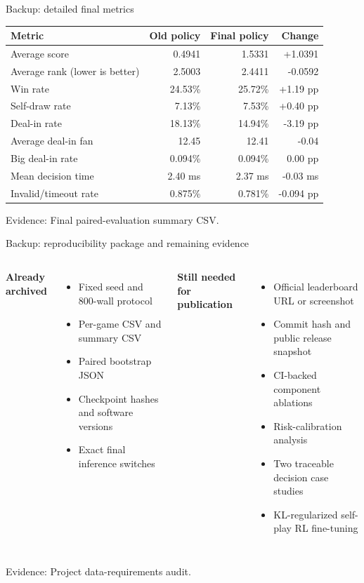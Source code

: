 \documentclass[aspectratio=169,10pt]{beamer}
\newif\ifnobackup
\newcommand{\keypoint}[1]{{\color{TealDark}\bfseries #1}}
\newcommand{\danger}[1]{{\color{Coral}\bfseries #1}}
\newcommand{\source}[1]{%
  \vfill
  \ifnobackup\else
    {\fontsize{6.8}{8}\selectfont\color{Muted}Evidence: #1\par}
  \fi
}
\begin{document}
\begin{frame}{Backup: detailed final metrics}
  \vspace{0.05cm}
  \centering
  \renewcommand{\arraystretch}{1.20}
  \begin{tabular}{lrrr}
    \toprule
    \textbf{Metric} & \textbf{Old policy} & \textbf{Final policy} & \textbf{Change}\\
    \midrule
    Average score & 0.4941 & 1.5331 & +1.0391\\
    Average rank (lower is better) & 2.5003 & 2.4411 & -0.0592\\
    Win rate & 24.53\% & 25.72\% & +1.19 pp\\
    Self-draw rate & 7.13\% & 7.53\% & +0.40 pp\\
    Deal-in rate & 18.13\% & 14.94\% & -3.19 pp\\
    Average deal-in fan & 12.45 & 12.41 & -0.04\\
    Big deal-in rate & 0.094\% & 0.094\% & 0.00 pp\\
    Mean decision time & 2.40 ms & 2.37 ms & -0.03 ms\\
    Invalid/timeout rate & 0.875\% & 0.781\% & -0.094 pp\\
    \bottomrule
  \end{tabular}
  \source{Final paired-evaluation summary CSV.}
\end{frame}

\begin{frame}{Backup: reproducibility package and remaining evidence}
  \vspace{0.06cm}
  \begin{columns}[T,onlytextwidth]
      \keypoint{Already archived}
      \begin{itemize}
        \item Fixed seed and 800-wall protocol
        \item Per-game CSV and summary CSV
        \item Paired bootstrap JSON
        \item Checkpoint hashes and software versions
        \item Exact final inference switches
      \end{itemize}
      \danger{Still needed for publication}
      \begin{itemize}
        \item Official leaderboard URL or screenshot
        \item Commit hash and public release snapshot
        \item CI-backed component ablations
        \item Risk-calibration analysis
        \item Two traceable decision case studies
        \item KL-regularized self-play RL fine-tuning
      \end{itemize}
  \end{columns}
  \source{Project data-requirements audit.}
\end{frame}

\fi
\end{document}
